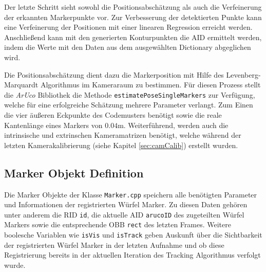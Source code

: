  Der letzte Schritt sieht sowohl die Positionsabschätzung als auch die Verfeinerung der erkannten Markerpunkte vor. Zur Verbesserung der detektierten Punkte kann eine Verfeinerung der Positionen mit einer linearen Regression erreicht werden. Anschließend kann mit den generierten Konturpunkten die AID ermittelt werden, indem die Werte mit den Daten aus dem ausgewählten Dictionary abgeglichen wird.
  
 Die Positionsabschätzung dient dazu die Markerposition mit Hilfe des Levenberg-Marquardt Algorithmus \cite{article:Levenberg} im Kameraraum zu bestimmen. Für diesen Prozess stellt die \textit{ArUco} Bibliothek die Methode \texttt{estimatePoseSingleMarkers} zur Verfügung, welche für eine erfolgreiche Schätzung mehrere Parameter verlangt. Zum Einen die vier äußeren Eckpunkte des Codemusters benötigt sowie die reale Kantenlänge eines Markers von $0.04$m. Weiterführend, werden auch die intrinsische und extrinschen Kameramatrizen benötigt, welche während der letzten Kamerakalibrierung (siehe Kapitel \ref{sec:camCalib}) erstellt wurden.
 
\subsection{Marker Objekt Definition}\label{sec:MarkerObjekte}
Die Marker Objekte der Klasse \texttt{Marker.cpp} speichern alle benötigten Parameter und Informationen der registrierten Würfel Marker. Zu diesen Daten gehören unter anderem die RID \texttt{id}, die aktuelle AID \texttt{arucoID} des zugeteilten Würfel Markers sowie die entsprechende OBB \texttt{rect} des letzten Frames. Weitere boolesche Variablen wie \texttt{isVis} und \texttt{isTrack} geben Auskunft über die Sichtbarkeit der registrierten Würfel Marker in der letzten Aufnahme und ob diese Registrierung bereits in der aktuellen Iteration des Tracking Algorithmus verfolgt wurde.

